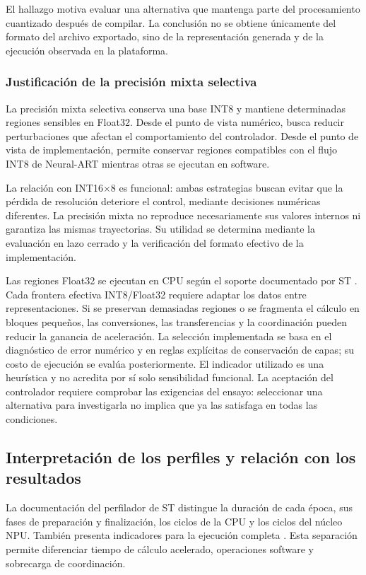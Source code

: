 El hallazgo motiva evaluar una alternativa que mantenga parte del procesamiento cuantizado después de compilar. La conclusión no se obtiene únicamente del formato del archivo exportado, sino de la representación generada y de la ejecución observada en la plataforma.

\subsubsection{Justificación de la precisión mixta selectiva}
La precisión mixta selectiva conserva una base INT8 y mantiene determinadas regiones sensibles en Float32. Desde el punto de vista numérico, busca reducir perturbaciones que afectan el comportamiento del controlador. Desde el punto de vista de implementación, permite conservar regiones compatibles con el flujo INT8 de Neural-ART mientras otras se ejecutan en software.

La relación con INT16$\times$8 es funcional: ambas estrategias buscan evitar que la pérdida de resolución deteriore el control, mediante decisiones numéricas diferentes. La precisión mixta no reproduce necesariamente sus valores internos ni garantiza las mismas trayectorias. Su utilidad se determina mediante la evaluación en lazo cerrado y la verificación del formato efectivo de la implementación.

Las regiones Float32 se ejecutan en CPU según el soporte documentado por ST \cite{cap4_stoperators}. Cada frontera efectiva INT8/Float32 requiere adaptar los datos entre representaciones. Si se preservan demasiadas regiones o se fragmenta el cálculo en bloques pequeños, las conversiones, las transferencias y la coordinación pueden reducir la ganancia de aceleración. La selección implementada se basa en el diagnóstico de error numérico y en reglas explícitas de conservación de capas; su costo de ejecución se evalúa posteriormente. El indicador utilizado es una heurística y no acredita por sí solo sensibilidad funcional. La aceptación del controlador requiere comprobar las exigencias del ensayo: seleccionar una alternativa para investigarla no implica que ya las satisfaga en todas las condiciones.

\subsection{Interpretación de los perfiles y relación con los resultados}\label{sec:cap4_perfiles}
La documentación del perfilador de ST distingue la duración de cada época, sus fases de preparación y finalización, los ciclos de la CPU y los ciclos del núcleo NPU. También presenta indicadores para la ejecución completa \cite{cap4_stprofiler}. Esta separación permite diferenciar tiempo de cálculo acelerado, operaciones software y sobrecarga de coordinación.

